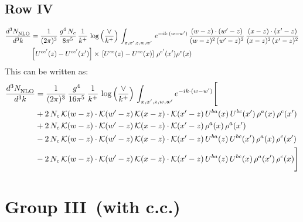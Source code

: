 \documentclass[9pt]{article}
\numberwithin{equation}{section}
\begin{document}
\subsection{Row IV}
\begin{align}
    \frac{d^{3}N_{\rm NLO}^{\rm}}{d^{3}k}  & =      \frac{1}{(2\pi)^{3}}\,\frac{g^{4}\,N_{c}}{8\pi^{5}}\,\frac{1}{k^{+}}\,\log{\left(\frac{\vee}{k^{+}}\right)}\,\int_{x,x',z,w,w'}\,e^{-ik\cdot (w-w')}\,\frac{(w-z)\cdot(w'-z)}{(w-z)^{2}\,(w'-z)^{2}}\,\frac{(x-z)\cdot(x'-z)}{(x-z)^{2}\,(x'-z)^{2}}\notag \\ &   \left[U^{ce'}(z) - U^{ce'}(x')\right] \times\, \left[U^{ce}(z) - U^{ce}(x)\right]\, \rho^{e'}(x') \rho^{e}(x)
\end{align}
This can be written as: 
\begin{align}
    \frac{d^{3}N_{\rm NLO}^{\rm}}{d^{3}k}  & = \frac{1}{(2\pi)^{3}}\,\frac{g^{4}}{16\pi^{5}}\,\frac{1}{k^{+}}\,\log{\left(\frac{\vee}{k^{+}}\right)}\, \int_{x,x',z,w,w'}e^{-ik\cdot (w-w')}\Bigg[\notag\\ & +2\,N_{c}\,\mathcal{K}(w-z)\cdot\mathcal{K}(w'-z)\,\mathcal{K}(x-z)\cdot\mathcal{K}(x'-z)\,U^{ba}(x)\,U^{bc}(x')\,\rho^{a}(x)\,\rho^{c}(x')\notag \\ 
&+2\,N_{c}\,\mathcal{K}(w-z)\cdot\mathcal{K}(w'-z)\,\mathcal{K}(x-z)\cdot\mathcal{K}(x'-z)\,\rho^{a}(x)\,\rho^{a}(x')\notag \\ 
&-2\,N_{c}\,\mathcal{K}(w-z)\cdot\mathcal{K}(w'-z)\,\mathcal{K}(x-z)\cdot\mathcal{K}(x'-z)\,U^{ba}(z)\,U^{bc}(x')\,\rho^{a}(x)\,\rho^{c}(x')\notag \\ 
&-2\,N_{c}\,\mathcal{K}(w-z)\cdot\mathcal{K}(w'-z)\,\mathcal{K}(x-z)\cdot\mathcal{K}(x'-z)\,U^{ba}(z)\,U^{bc}(x)\,\rho^{a}(x')\,\rho^{c}(x)\Bigg]
\end{align}
\section{Group III\, (with c.c.)}
\end{document}
